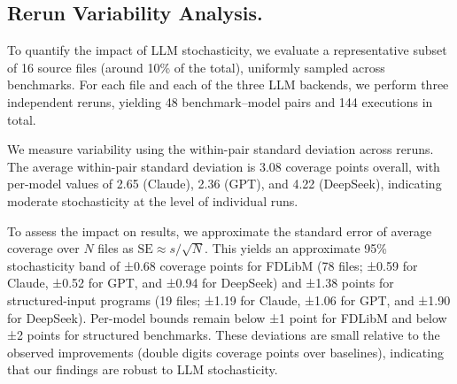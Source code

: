 \documentclass[acmsmall,screen,nonacm]{acmart}
\newenvironment{revblock}{\color{red}}{}
\newenvironment{revblock}{}{}
\theoremstyle{definition}
\begin{document}
\begin{revblock}
  \subsection{Rerun Variability Analysis.}
  
To quantify the impact of LLM stochasticity, we evaluate a representative subset of 16 source files (around 10\% of the total), uniformly sampled across benchmarks. For each file and each of the three LLM backends, we perform three independent reruns, yielding 48 benchmark–model pairs and 144 executions in total. 

We measure variability using the within-pair standard deviation across reruns. The average within-pair standard deviation is 3.08 coverage points overall, with per-model values of 2.65 (Claude), 2.36 (GPT), and 4.22 (DeepSeek), indicating moderate stochasticity at the level of individual runs.

To assess the impact on results, we approximate the standard error of average coverage over $N$ files as $\mathrm{SE} \approx s / \sqrt{N}$. This yields an approximate 95\% stochasticity band of ±0.68 coverage points for FDLibM (78 files; ±0.59 for Claude, ±0.52 for GPT, and ±0.94 for DeepSeek) and ±1.38 points for structured-input programs (19 files; ±1.19 for Claude, ±1.06 for GPT, and ±1.90 for DeepSeek). Per-model bounds remain below ±1 point for FDLibM and below ±2 points for structured benchmarks.
These deviations are small relative to the observed improvements (double digits coverage points over baselines), indicating that our findings are robust to LLM stochasticity.
\end{revblock}
    




\end{document}
